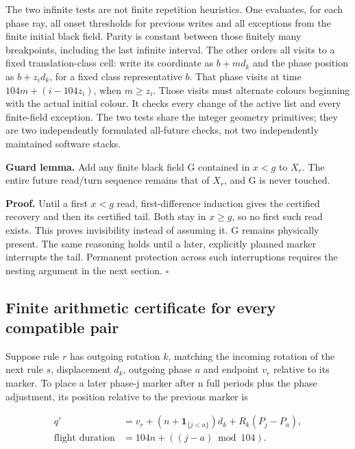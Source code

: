 The two infinite tests are not finite repetition heuristics. One
evaluates, for each phase ray, all onset thresholds for previous writes
and all exceptions from the finite initial black field. Parity is
constant between those finitely many breakpoints, including the last
infinite interval. The other orders all visits to a fixed
translation-class cell: write its coordinate as $b+md_k$ and the
phase position as $b+z_id_k$, for a fixed class representative $b$. That phase visits at time $104m+(i-104z_i)$, when
$m\ge z_i$. Those visits must alternate colours beginning with
the actual initial colour. It checks every change of the active list and
every finite-field exception. The two tests share the integer geometry
primitives; they are two independently formulated all-future checks, not
two independently maintained software stacks.

\textbf{Guard lemma.} Add any finite black field G contained in
$x<g$ to $X_r$. The entire future read/turn sequence remains that
of $X_r$, and G is never touched.

\textbf{Proof.} Until a first $x<g$ read, first-difference
induction gives the certified recovery and then its certified tail. Both
stay in $x\ge g$, so no first such read exists. This proves
invisibility instead of assuming it. G remains physically present. The
same reasoning holds until a later, explicitly planned marker interrupts
the tail. Permanent protection across such interruptions requires the
nesting argument in the next section. \(\square\)

\subsection{Finite arithmetic certificate for every compatible
pair}\label{scattering-4}

Suppose rule $r$ has outgoing rotation $k$, matching the incoming rotation
of the next rule $s$, displacement $d_k$, outgoing phase $a$ and endpoint
$v_r$ relative to its marker. To place a later phase-j marker after n full
periods plus the phase adjustment, its position relative to the previous
marker is

\begin{equation}\label{eq:sc1}
\begin{aligned}q'&=v_r+(n+\mathbf1_{\{j<a\}})d_k+R_k(P_j-P_a),\\\text{flight duration}&=104n+((j-a)\bmod104).\end{aligned}
\end{equation}

